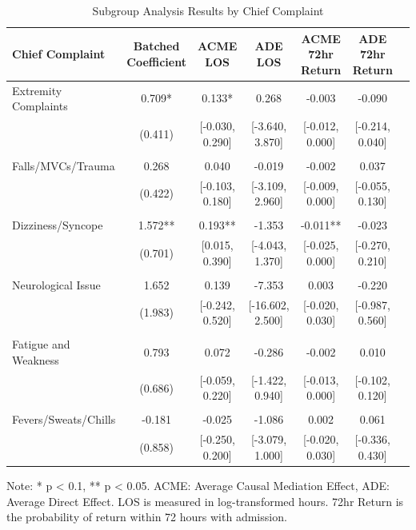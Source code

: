 \documentclass{article}
\begin{document}
\begin{table}[!htbp]
\centering
\caption{Subgroup Analysis Results by Chief Complaint}
\label{tab:subgroup_analysis}
\tiny
\begin{tabularx}{\textwidth}{Xcccccc}
\toprule
Chief Complaint & Batched Coefficient & ACME LOS & ADE LOS & ACME 72hr Return & ADE 72hr Return \\
\midrule
Extremity Complaints & 0.709* & 0.133* & 0.268 & -0.003 & -0.090 \\
 & (0.411) & [-0.030, 0.290] & [-3.640, 3.870] & [-0.012, 0.000] & [-0.214, 0.040] \\
 \\
Falls/MVCs/Trauma & 0.268 & 0.040 & -0.019 & -0.002 & 0.037 \\
 & (0.422) & [-0.103, 0.180] & [-3.109, 2.960] & [-0.009, 0.000] & [-0.055, 0.130] \\
 \\
Dizziness/Syncope & 1.572** & 0.193** & -1.353 & -0.011** & -0.023 \\
 & (0.701) & [0.015, 0.390] & [-4.043, 1.370] & [-0.025, 0.000] & [-0.270, 0.210] \\
 \\
Neurological Issue & 1.652 & 0.139 & -7.353 & 0.003 & -0.220 \\
 & (1.983) & [-0.242, 0.520] & [-16.602, 2.500] & [-0.020, 0.030] & [-0.987, 0.560] \\
 \\
Fatigue and Weakness & 0.793 & 0.072 & -0.286 & -0.002 & 0.010 \\
 & (0.686) & [-0.059, 0.220] & [-1.422, 0.940] & [-0.013, 0.000] & [-0.102, 0.120] \\
 \\
Fevers/Sweats/Chills & -0.181 & -0.025 & -1.086 & 0.002 & 0.061 \\
 & (0.858) & [-0.250, 0.200] & [-3.079, 1.000] & [-0.020, 0.030] & [-0.336, 0.430] \\
\bottomrule
\end{tabularx}
\small Note: * p < 0.1, ** p < 0.05. ACME: Average Causal Mediation Effect, ADE: Average Direct Effect. LOS is measured in log-transformed hours. 72hr Return is the probability of return within 72 hours with admission.
\end{table}
\end{document}
